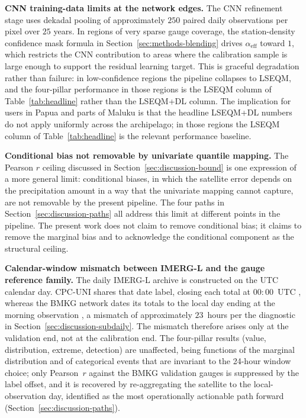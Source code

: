 \textbf{CNN training-data limits at the network edges.} The CNN
refinement stage uses dekadal pooling of approximately $250$
paired daily observations per pixel over $25$ years. In regions
of very sparse gauge coverage, the station-density confidence
mask formula in Section~\ref{sec:methods-blending} drives
$\alpha_{\text{eff}}$ toward $1$, which restricts the CNN
contribution to areas where the calibration sample is large
enough to support the residual learning target. This is graceful
degradation rather than failure: in low-confidence regions the
pipeline collapses to LSEQM, and the four-pillar performance in
those regions is the LSEQM column of Table~\ref{tab:headline}
rather than the LSEQM+DL column. The implication for users in
Papua and parts of Maluku is that the headline LSEQM+DL numbers
do not apply uniformly across the archipelago; in those regions
the LSEQM column of Table~\ref{tab:headline} is the relevant
performance baseline.

\textbf{Conditional bias not removable by univariate quantile
mapping.} The Pearson $r$ ceiling discussed in
Section~\ref{sec:discussion-bound} is one expression of a more
general limit: conditional biases, in which the satellite error
depends on the precipitation amount in a way that the univariate
mapping cannot capture, are not removable by the present
pipeline. The four paths in Section~\ref{sec:discussion-paths}
all address this limit at different points in the pipeline. The
present work does not claim to remove conditional bias; it
claims to remove the marginal bias and to acknowledge the
conditional component as the structural ceiling.

\textbf{Calendar-window mismatch between IMERG-L and the gauge
reference family.} The daily IMERG-L archive is constructed on
the UTC calendar day. CPC-UNI shares that date label, closing each
total at $00{:}00$~UTC \citep{ref:cpcuni_readme}, whereas the BMKG
network dates its totals to the local day ending at the morning
observation \citep{ref:bmkg2006sk32}, a mismatch of approximately
$23$~hours per the diagnostic in
Section~\ref{sec:discussion-subdaily}. The mismatch therefore
arises only at the validation end, not at the calibration end. The four-pillar results
(value, distribution, extreme, detection) are unaffected, being
functions of the marginal distribution and of categorical events
that are invariant to the 24-hour window choice; only Pearson~$r$
against the BMKG validation gauges is suppressed by the label
offset, and it is recovered by re-aggregating the satellite to the
local-observation day, identified as the most operationally
actionable path forward (Section~\ref{sec:discussion-paths}).


